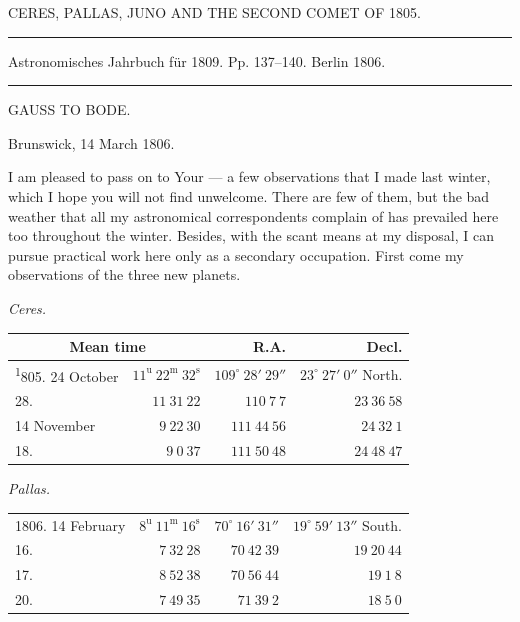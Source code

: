 \clearpage
{}
\begin{center}
CERES, PALLAS, JUNO AND THE SECOND COMET OF 1805.
\end{center}

\noindent\rule{\linewidth}{0.4pt}
\begin{center}
Astronomisches Jahrbuch für 1809. Pp. 137–140. Berlin 1806.
\end{center}
\noindent\rule{\linewidth}{0.4pt}

\begin{center}
GAUSS TO BODE.
\end{center}
\hfill Brunswick, 14 March 1806.

\par\indent I am pleased to pass on to Your --- a few observations that I made last winter, which I hope you will not find unwelcome. There are few of them, but the bad weather that all my astronomical correspondents complain of has prevailed here too throughout the winter. Besides, with the scant means at my disposal, I can pursue practical work here only as a secondary occupation. First come my observations of the three new planets.

\begin{center}\emph{Ceres.}\end{center}
\begin{center}
\begingroup\fontsize{9}{11}\selectfont\setlength{\tabcolsep}{2pt}\renewcommand{\arraystretch}{1.1}
\begin{tabular}{lr|r|r}
\multicolumn{2}{c|}{Mean time} & R.A. & Decl.\\ \hline
\textsuperscript{1}805. 24 October & $11^{\mathrm u}\ 22^{\mathrm m}\ 32^{\mathrm s}$ & $109^\circ\ 28'\ 29''$ & $23^\circ\ 27'\ 0''$ North.\\
28. & $11\ 31\ 22$ & $110\ 7\ 7$ & $23\ 36\ 58$\\
14 November & $9\ 22\ 30$ & $111\ 44\ 56$ & $24\ 32\ 1$\\
18. & $9\ 0\ 37$ & $111\ 50\ 48$ & $24\ 48\ 47$\\
\end{tabular}\endgroup
\end{center}

\begin{center}\emph{Pallas.}\end{center}
\begin{center}
\begingroup\fontsize{9}{11}\selectfont\setlength{\tabcolsep}{2pt}\renewcommand{\arraystretch}{1.1}
\begin{tabular}{lr|r|r}
1806. 14 February & $8^{\mathrm u}\ 11^{\mathrm m}\ 16^{\mathrm s}$ & $70^\circ\ 16'\ 31''$ & $19^\circ\ 59'\ 13''$ South.\\
16. & $7\ 32\ 28$ & $70\ 42\ 39$ & $19\ 20\ 44$\\
17. & $8\ 52\ 38$ & $70\ 56\ 44$ & $19\ 1\ 8$\\
20. & $7\ 49\ 35$ & $71\ 39\ 2$ & $18\ 5\ 0$\\
\end{tabular}\endgroup
\end{center}

